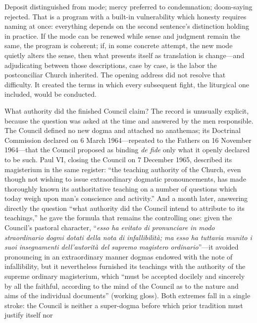 Deposit distinguished from mode; mercy preferred to condemnation; doom-saying rejected. That is a program with a built-in vulnerability which honesty requires naming at once: everything depends on the second sentence's distinction holding in practice. If the mode can be renewed while sense and judgment remain the same, the program is coherent; if, in some concrete attempt, the new mode quietly alters the sense, then what presents itself as translation is change---and adjudicating between those descriptions, case by case, is the labor the postconciliar Church inherited. The opening address did not resolve that difficulty. It created the terms in which every subsequent fight, the liturgical one included, would be conducted.

What authority did the finished Council claim? The record is unusually explicit, because the question was asked at the time and answered by the men responsible. The Council defined no new dogma and attached no anathemas; its Doctrinal Commission declared on 6 March 1964---repeated to the Fathers on 16 November 1964---that the Council proposed as binding \emph{de fide} only what it openly declared to be such. Paul VI, closing the Council on 7 December 1965, described its magisterium in the same register: ``the teaching authority of the Church, even though not wishing to issue extraordinary dogmatic pronouncements, has made thoroughly known its authoritative teaching on a number of questions which today weigh upon man's conscience and activity.'' And a month later, answering directly the question ``what authority did the Council intend to attribute to its teachings,'' he gave the formula that remains the controlling one: given the Council's pastoral character, ``\emph{esso ha evitato di pronunciare in modo straordinario dogmi dotati della nota di infallibilità; ma esso ha tuttavia munito i suoi insegnamenti dell'autorità del supremo magistero ordinario}''---it avoided pronouncing in an extraordinary manner dogmas endowed with the note of infallibility, but it nevertheless furnished its teachings with the authority of the supreme ordinary magisterium, which ``must be accepted docilely and sincerely by all the faithful, according to the mind of the Council as to the nature and aims of the individual documents'' (working gloss). Both extremes fall in a single stroke: the Council is neither a super-dogma before which prior tradition must justify itself nor 